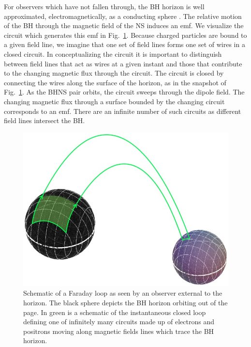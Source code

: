For observers which have not fallen through, the BH horizon is well
approximated, electromagnetically, as a conducting sphere
\citep{MPBook}. The relative motion of the BH through the magnetic
field of the NS induces an emf. We visualize the circuit which
generates this emf in Fig.\ \ref{Fig:Contour}. Because charged
particles are bound to a given field line, we imagine that one set of
field lines forms one set of wires in a closed circuit. In
conceptualizing the circuit it is important to distinguish between
field lines that act as wires at a given instant and those that
contribute to the changing magnetic flux through the circuit. The
circuit is closed by connecting the wires along the surface of the
horizon, as in the snapshot of Fig.\ \ref{Fig:Contour}.  As the BHNS
pair orbits, the circuit sweeps through the dipole field. The changing
magnetic flux through a surface bounded by the changing circuit
corresponds to an emf. There are an infinite number of such circuits
as different field lines intersect the BH.


\begin{figure}
\begin{center}
\includegraphics[scale=0.33]{figures/ch7/BHB_ShadedFaradayContour} 
\end{center}
\caption{Schematic of a Faraday loop as seen by an observer external
  to the horizon. The black sphere depicts the BH horizon orbiting out
  of the page. In green is a schematic of the instantaneous closed
  loop defining one of infinitely many circuits made up of electrons
  and positrons moving along magnetic fields lines which trace the BH
  horizon.}
\label{Fig:Contour}
\end{figure}



